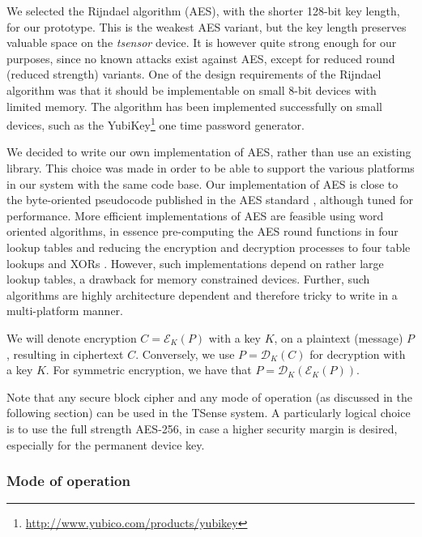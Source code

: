 We selected the Rijndael algorithm (AES), with the shorter 128-bit key length, for our prototype. This is the weakest AES variant, but the key length preserves valuable space on the \textit{tsensor} device. It is however quite strong enough for our purposes, since no known attacks exist against AES, except for reduced round (reduced strength) variants. One of the design requirements of the Rijndael algorithm was that it should be implementable on small 8-bit devices with limited memory. The algorithm has been implemented successfully on small devices, such as the YubiKey\footnote{\url{http://www.yubico.com/products/yubikey}} one time password generator.

We decided to write our own implementation of AES, rather than use an existing library. This choice was made in order to be able to support the various platforms in our system with the same code base. Our implementation of AES is close to the byte-oriented pseudocode published in the AES standard , although tuned for performance. More efficient implementations of AES are feasible using word oriented algorithms, in essence pre-computing the AES round functions in four lookup tables and reducing the encryption and decryption processes to four table lookups and XORs \cite[Section 5.2]{daemen1999}. However, such implementations depend on rather large lookup tables, a drawback for memory constrained devices. Further, such algorithms are highly architecture dependent and therefore tricky to write in a multi-platform manner. 

We will denote encryption $C=\mathcal{E}_K(P)$ with a key $K$, on a plaintext (message) $P$, resulting in ciphertext $C$. Conversely, we use $P=\mathcal{D}_K(C)$ for decryption with a key $K$. For symmetric encryption, we have that $P=\mathcal{D}_K(\mathcal{E}_K(P))$.

Note that any secure block cipher and any mode of operation (as discussed in the following section) can be used in the TSense system. A particularly logical choice is to use the full strength AES-256, in case a higher security margin is desired, especially for the permanent device key.

\subsubsection{Mode of operation}

